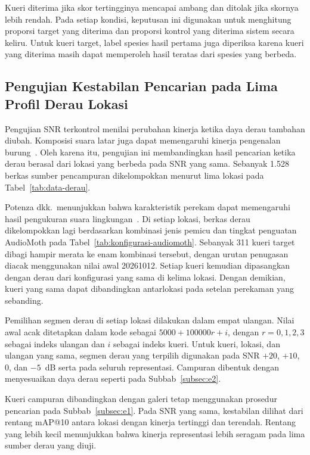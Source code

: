 Kueri diterima jika skor tertingginya mencapai ambang dan ditolak jika skornya lebih rendah. Pada setiap kondisi, keputusan ini digunakan untuk menghitung proporsi target yang diterima dan proporsi kontrol yang diterima sistem secara keliru. Untuk kueri target, label spesies hasil pertama juga diperiksa karena kueri yang diterima masih dapat memperoleh hasil teratas dari spesies yang berbeda.

\subsection{Pengujian Kestabilan Pencarian pada Lima Profil Derau Lokasi}
\label{subsec:e4}

Pengujian SNR terkontrol menilai perubahan kinerja ketika daya derau tambahan diubah. Komposisi suara latar juga dapat memengaruhi kinerja pengenalan burung~\cite{clark2023soundscape}. Oleh karena itu, pengujian ini membandingkan hasil pencarian ketika derau berasal dari lokasi yang berbeda pada SNR yang sama. Sebanyak 1.528 berkas sumber pencampuran dikelompokkan menurut lima lokasi pada Tabel~\ref{tab:data-derau}.

Potenza dkk.\ menunjukkan bahwa karakteristik perekam dapat memengaruhi hasil pengukuran suara lingkungan~\cite{potenza2024recorders}. Di setiap lokasi, berkas derau dikelompokkan lagi berdasarkan kombinasi jenis pemicu dan tingkat penguatan AudioMoth pada Tabel~\ref{tab:konfigurasi-audiomoth}. Sebanyak 311 kueri target dibagi hampir merata ke enam kombinasi tersebut, dengan urutan penugasan diacak menggunakan nilai awal 20261012. Setiap kueri kemudian dipasangkan dengan derau dari konfigurasi yang sama di kelima lokasi. Dengan demikian, kueri yang sama dapat dibandingkan antarlokasi pada setelan perekaman yang sebanding.

Pemilihan segmen derau di setiap lokasi dilakukan dalam empat ulangan. Nilai awal acak ditetapkan dalam kode sebagai $5000+100000r+i$, dengan $r=0,1,2,3$ sebagai indeks ulangan dan $i$ sebagai indeks kueri. Untuk kueri, lokasi, dan ulangan yang sama, segmen derau yang terpilih digunakan pada SNR $+20$, $+10$, $0$, dan $-5$~dB serta pada seluruh representasi. Campuran dibentuk dengan menyesuaikan daya derau seperti pada Subbab~\ref{subsec:e2}.

Kueri campuran dibandingkan dengan galeri tetap menggunakan prosedur pencarian pada Subbab~\ref{subsec:e1}. Pada SNR yang sama, kestabilan dilihat dari rentang mAP@10 antara lokasi dengan kinerja tertinggi dan terendah. Rentang yang lebih kecil menunjukkan bahwa kinerja representasi lebih seragam pada lima sumber derau yang diuji.

